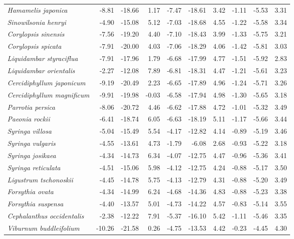 \documentclass[11pt]{article}
\begin{document}
\begin{longtable}{lrrrrrrrrr}
  \emph{Hamamelis japonica} & -8.81 & -18.66 & 1.17 & -7.47 & -18.61 & 3.42 & -1.11 & -5.53 & 3.31 \\ 
  \emph{Sinowilsonia henryi} & -4.90 & -15.08 & 5.12 & -7.03 & -18.68 & 4.55 & -1.22 & -5.58 & 3.34 \\ 
  \emph{Corylopsis sinensis} & -7.56 & -19.20 & 4.40 & -7.10 & -18.43 & 3.99 & -1.33 & -5.75 & 3.21 \\ 
  \emph{Corylopsis spicata} & -7.91 & -20.00 & 4.03 & -7.06 & -18.29 & 4.06 & -1.42 & -5.81 & 3.03 \\ 
  \emph{Liquidambar styraciflua} & -7.91 & -17.96 & 1.79 & -6.68 & -17.99 & 4.77 & -1.51 & -5.92 & 2.83 \\ 
  \emph{Liquidambar orientalis} & -2.27 & -12.08 & 7.89 & -6.81 & -18.31 & 4.47 & -1.21 & -5.61 & 3.23 \\ 
  \emph{Cercidiphyllum japonicum} & -9.19 & -20.49 & 2.23 & -6.65 & -17.89 & 4.96 & -1.24 & -5.71 & 3.26 \\ 
  \emph{Cercidiphyllum magnificum} & -9.91 & -19.98 & -0.03 & -6.58 & -17.94 & 4.98 & -1.30 & -5.65 & 3.18 \\ 
  \emph{Parrotia persica} & -8.06 & -20.72 & 4.46 & -6.62 & -17.88 & 4.72 & -1.01 & -5.32 & 3.49 \\ 
  \emph{Paeonia rockii} & -6.41 & -18.74 & 6.05 & -6.63 & -18.19 & 5.11 & -1.17 & -5.66 & 3.44 \\ 
  \emph{Syringa villosa} & -5.04 & -15.49 & 5.54 & -4.17 & -12.82 & 4.14 & -0.89 & -5.19 & 3.46 \\ 
  \emph{Syringa vulgaris} & -4.55 & -13.61 & 4.73 & -1.79 & -6.08 & 2.68 & -0.93 & -5.22 & 3.18 \\ 
  \emph{Syringa josikaea} & -4.34 & -14.73 & 6.34 & -4.07 & -12.75 & 4.47 & -0.96 & -5.36 & 3.41 \\ 
  \emph{Syringa reticulata} & -4.51 & -15.06 & 5.98 & -4.12 & -12.75 & 4.24 & -0.88 & -5.17 & 3.50 \\ 
  \emph{Ligustrum tschonoskii} & -4.45 & -14.78 & 5.75 & -4.13 & -12.79 & 4.31 & -0.88 & -5.20 & 3.49 \\ 
  \emph{Forsythia ovata} & -4.34 & -14.99 & 6.24 & -4.68 & -14.36 & 4.83 & -0.88 & -5.23 & 3.38 \\ 
  \emph{Forsythia suspensa} & -4.40 & -13.57 & 5.01 & -4.73 & -14.22 & 4.57 & -0.83 & -5.14 & 3.55 \\ 
  \emph{Cephalanthus occidentalis} & -2.38 & -12.22 & 7.91 & -5.37 & -16.10 & 5.42 & -1.11 & -5.46 & 3.35 \\ 
  \emph{Viburnum buddleifolium} & -10.26 & -21.58 & 0.26 & -4.75 & -13.53 & 4.42 & -0.23 & -4.45 & 4.30 \\ 

\end{longtable}
\end{document}
